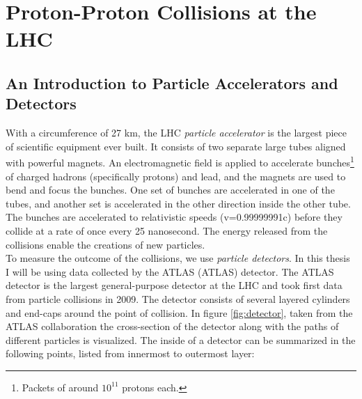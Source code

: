 \section{Proton-Proton Collisions at the LHC}
\subsection{An Introduction to Particle Accelerators and Detectors}\label{subsec:Detector}
With a circumference of 27 km, the \acf{LHC} \emph{particle accelerator} is the largest piece of scientific 
equipment ever built. It consists of two separate large tubes aligned with powerful magnets. An electromagnetic field is
applied to accelerate bunches\footnote{Packets of around $10^{11}$ protons each.} of charged hadrons (specifically protons) and lead,
and the magnets are used to bend and focus the bunches. One set of bunches are accelerated in one of the tubes, 
and another set is accelerated in the other direction inside the other tube. The bunches are accelerated to relativistic speeds
(v=0.99999991c) before they collide at a rate of once every 25 nanosecond. The energy released from 
the collisions enable the creations of new particles.
\\
To measure the outcome of the collisions, we use \emph{particle detectors}. In this thesis I will be using data collected by the 
\acs{ATLAS} (\acl{ATLAS}) detector. The \ac{ATLAS} detector is the largest general-purpose detector at the \ac{LHC}
and took first data from particle collisions in 2009. The detector consists of several layered cylinders and end-caps 
around the point of collision. In figure \ref{fig:detector}, taken from the \ac{ATLAS} collaboration \cite{PDetector} the cross-section 
of the detector along with the paths of different particles is visualized. The inside of a detector can be summarized 
in the following points, listed from innermost to outermost layer:
